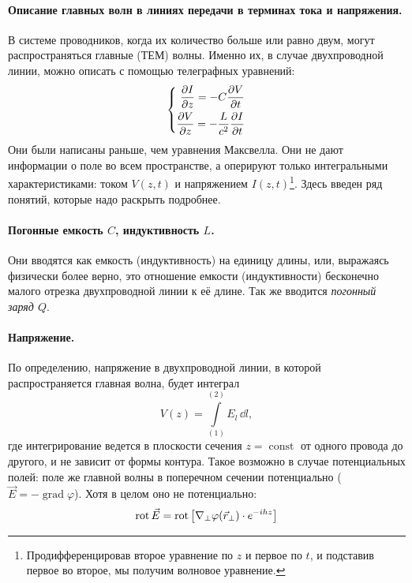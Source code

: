\documentclass[a4paper,14pt]{extarticle}
\DeclareMathOperator{\Rot}{rot}
\DeclareMathOperator{\Grad}{grad}
\DeclareMathOperator{\const}{const}
\renewcommand{\phi}{\varphi}
\begin{document}
\paragraph{Описание главных волн в линиях передачи в терминах тока и напряжения. } В системе проводников, когда их количество больше или равно двум, могут распространяться главные (ТЕМ) волны. Именно их, в случае двухпроводной линии, можно описать с помощью телеграфных уравнений:
\begin{equation}
	\left\{\begin{aligned}
		\pdv{I}{z} = -C\pdv{V}{t}\\
		\pdv{V}{z} = -\frac{L}{c^2} \pdv{I}{t}
	\end{aligned}\right.
\end{equation}
Они были написаны раньше, чем уравнения Максвелла. Они не дают информации о поле во всем пространстве, а оперируют только интегральными характеристиками: током $V(z,t)$ и напряжением $I(z,t)$\footnote{Продифференцировав второе уравнение по $z$ и первое по $t$, и подставив первое во второе, мы получим волновое уравнение.}.
Здесь введен ряд понятий, которые надо раскрыть подробнее.

\paragraph{Погонные емкость $C$, индуктивность $L$.} Они вводятся как емкость (индуктивность) на единицу длины, или, выражаясь физически более верно, это отношение емкости (индуктивности) бесконечно малого отрезка двухпроводной линии к её длине. Так же вводится \textit{погонный заряд $Q$}.

\paragraph{Напряжение. } По определению, напряжение в двухпроводной линии, в которой распространяется главная волна, будет интеграл
\begin{equation}
	V(z) = \int\limits_{(1)}^{(2)} E_l\, \dd l,
\end{equation}
где интегрирование ведется в плоскости сечения $z=\const$ от одного провода до другого, и не зависит от формы контура. Такое возможно в случае потенциальных полей: поле же главной волны в поперечном сечении потенциально ($\vec{E}=-\Grad \phi$). Хотя в целом оно не потенциально:
\begin{equation}
	\Rot \vec{E} = \Rot\qty[
		\nabla_\perp \phi(\vec{r}_\perp)\cdot e^{-ihz}
	]
\end{equation}
\end{document}
